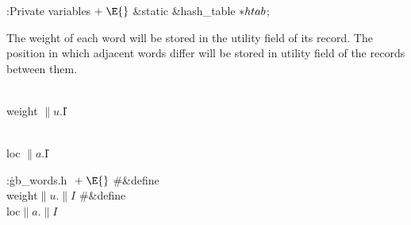 \B{}:Private variables\X${}\mathrel+\E{}$\6
\&{static} \&{hash\_table} ${}{*}\\{htab}{}$;\par
\fi

The weight of each word will be stored in the utility field  of its
 record. The position in which adjacent words differ will be
stored in utility field  of the  records between
them.

\Y\B\4\D\\{weight}\5
$\|u.{}$\|I\par
\B\4\D\\{loc}\5
$\|a.{}$\|I\par
\Y\B\4:\.{gb\_words.h }\X${}\mathrel+\E{}$\6
\8\#\&{define} \\{weight}\5${}\|u.\|I{}$\6
\8\#\&{define} \\{loc}\5${}\|a.\|I{}$\par
\fi

